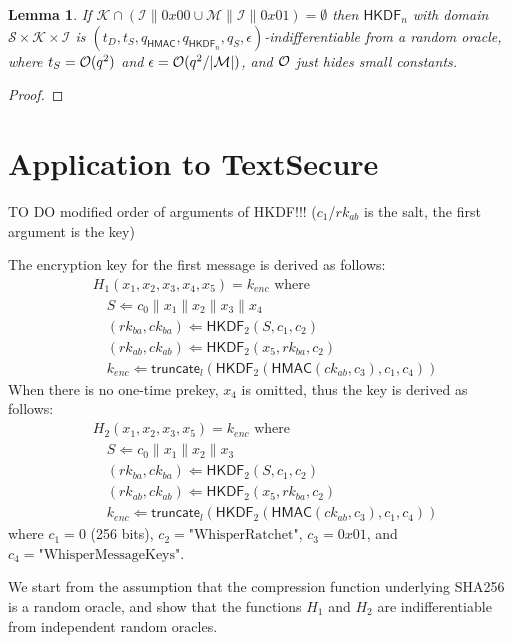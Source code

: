 \documentclass[compsoc, conference, letterpaper, 10pt, times]{IEEEtran}
\newcommand{\HMAC}{\mathsf{HMAC}}
\newcommand{\HKDF}{\mathsf{HKDF}}
\newcommand{\e}{\mathit{enc}}
\newcommand{\rk}{\mathit{rk}}
\newcommand{\ck}{\mathit{ck}}
\newtheorem{lemma}{Lemma}
\newcommand{\hmac}{\mathsf{HMAC}}
\newcommand{\Ssalt}{\mathcal{S}}
\newcommand{\Skey}{\mathcal{K}}
\newcommand{\Sinfo}{\mathcal{I}}
\newcommand{\Smac}{\mathcal{M}}
\newcommand{\truncate}{\mathsf{truncate}}
\begin{document}
\begin{lemma}\label{lem:hkdfindif}
If $\Skey \cap (\Sinfo \| 0x00 \cup \Smac \| \Sinfo \| 0x01) = \emptyset$
then $\HKDF_n$ with domain $\Ssalt \times \Skey \times \Sinfo$ is
$(t_D, t_S, q_{\hmac}, q_{\HKDF_n}, q_S, \epsilon)$-indifferentiable from a random oracle,
where $t_S = {\cal O}(q^2)$ and $\epsilon = {\cal O}(q^2/|\Smac|)$,
and ${\cal O}$ just hides small constants.
\end{lemma}
\begin{proof}

\end{proof}


\section{Application to TextSecure}

TO DO modified order of arguments of HKDF!!! ($c_1$/$\rk_{ab}$ is the salt,
the first argument is the key)

The encryption key for the first message is derived as follows:
\begin{align*}
&H_1(x_1, x_2, x_3, x_4, x_5) = k_{\e}\text{ where}\\
&\quad  S \Leftarrow c_0 \| x_1 \| x_2 \| x_3 \| x_4\\
&\quad  (\rk_{ba}, \ck_{ba}) \Leftarrow \HKDF_2(S, c_1, c_2)\\
&\quad  (\rk_{ab}, \ck_{ab}) \Leftarrow \HKDF_2(x_5, \rk_{ba}, c_2)\\
&\quad  k_{\e} \Leftarrow \truncate_l(\HKDF_2(\HMAC(\ck_{ab}, c_3), c_1, c_4))
\end{align*}
When there is no one-time prekey, $x_4$ is omitted, thus the key
is derived as follows:
\begin{align*}
&H_2(x_1, x_2, x_3, x_5) = k_{\e}\text{ where}\\
&\quad  S \Leftarrow c_0 \| x_1 \| x_2 \| x_3\\
&\quad  (\rk_{ba}, \ck_{ba}) \Leftarrow \HKDF_2(S, c_1, c_2)\\
&\quad  (\rk_{ab}, \ck_{ab}) \Leftarrow \HKDF_2(x_5, \rk_{ba}, c_2)\\
&\quad  k_{\e} \Leftarrow \truncate_l(\HKDF_2(\HMAC(\ck_{ab}, c_3), c_1, c_4))
\end{align*}
where $c_1 = 0$ (256 bits), $c_2 = \text{"WhisperRatchet"}$,
$c_3 = 0x01$, and $c_4 = \text{"WhisperMessageKeys"}$.



We start from the assumption that the compression function underlying SHA256 is a random oracle, and show that the functions $H_1$ and $H_2$ are
indifferentiable from independent random oracles.
\end{document}
